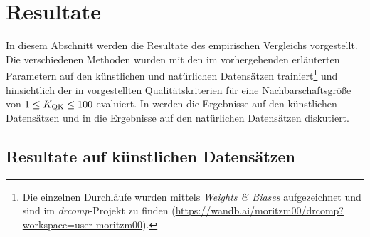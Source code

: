 \section{Resultate}
\label{ch:Vergleich:sec:Resultate}

In diesem Abschnitt werden die Resultate des empirischen Vergleichs vorgestellt. Die verschiedenen
Methoden wurden mit den im vorhergehenden 
erläuterten Parametern auf den künstlichen und natürlichen Datensätzen trainiert\footnote{Die
	einzelnen Durchläufe wurden mittels \textit{Weights \& Biases} aufgezeichnet und sind im
	\textit{drcomp}-Projekt zu finden
	(\url{https://wandb.ai/moritzm00/drcomp?workspace=user-moritzm00}).} und hinsichtlich der in
 vorgestellten Qualitätskriterien für
eine Nachbarschaftsgröße von $1 \leq K_{\text{QK}} \leq 100$ evaluiert. In
 werden die Ergebnisse auf den künstlichen
Datensätzen und in  die Ergebnisse auf den
natürlichen Datensätzen diskutiert.

\subsection{Resultate auf künstlichen Datensätzen}
\label{ch:Vergleich:sec:Resultate:kuenstlich}


